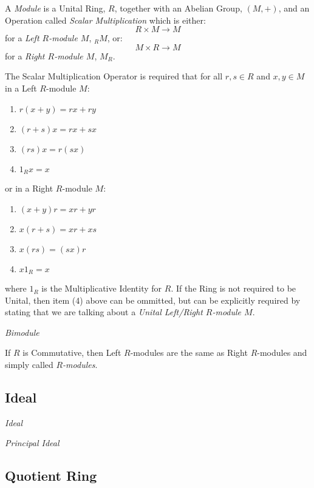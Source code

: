A \emph{Module} is a Unital Ring, $R$, together with an Abelian Group,
$(M, +)$, and an Operation called \emph{Scalar Multiplication} which
is either:
\[ R \times M \rightarrow M \]
for a \emph{Left $R$-module $M$}, $_R M$, or:
\[ M \times R \rightarrow M \]
for a \emph{Right $R$-module $M$}, $M_R$.

The Scalar Multiplication Operator is required that for all $r,s \in
R$ and $x,y \in M$ in a Left $R$-module $M$:
\begin{enumerate}
    \item $r(x + y) = rx + ry$
    \item $(r + s)x = rx + sx$
    \item $(rs)x = r(sx)$
    \item $1_Rx = x$
\end{enumerate}
or in a Right $R$-module $M$:
\begin{enumerate}
    \item $(x + y)r = xr + yr$
    \item $x(r + s) = xr + xs$
    \item $x(rs) = (sx)r$
    \item $x 1_R = x$
\end{enumerate}
where $1_R$ is the Multiplicative Identity for $R$. If the Ring is not
required to be Unital, then item (4) above can be ommitted, but can be
explicitly required by stating that we are talking about a
\emph{Unital Left/Right $R$-module $M$}.

\emph{Bimodule}

If $R$ is Commutative, then Left $R$-modules are the same as Right
$R$-modules and simply called \emph{$R$-modules}.



\subsection{Ideal}\label{subsec:ring_ideal}

\emph{Ideal}

\emph{Principal Ideal}



\subsection{Quotient Ring}



